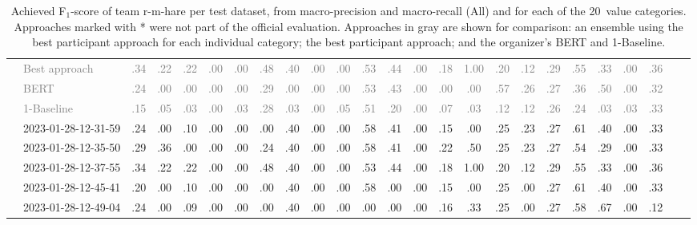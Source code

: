 \begin{table*}
\begin{tabular}{@{}ll@{\hspace{10pt}}c@{\hspace{5pt}}cccccccccccccccccccccc@{}}
& \textcolor{gray}{Best approach} & \textcolor{gray}{.34} & \textcolor{gray}{.22} & \textcolor{gray}{.22} & \textcolor{gray}{.00} & \textcolor{gray}{.00} & \textcolor{gray}{.48} & \textcolor{gray}{.40} & \textcolor{gray}{.00} & \textcolor{gray}{.00} & \textcolor{gray}{.53} & \textcolor{gray}{.44} & \textcolor{gray}{.00} & \textcolor{gray}{.18} & \textcolor{gray}{1.00} & \textcolor{gray}{.20} & \textcolor{gray}{.12} & \textcolor{gray}{.29} & \textcolor{gray}{.55} & \textcolor{gray}{.33} & \textcolor{gray}{.00} & \textcolor{gray}{.36} \\
& \textcolor{gray}{BERT} & \textcolor{gray}{.24} & \textcolor{gray}{.00} & \textcolor{gray}{.00} & \textcolor{gray}{.00} & \textcolor{gray}{.00} & \textcolor{gray}{.29} & \textcolor{gray}{.00} & \textcolor{gray}{.00} & \textcolor{gray}{.00} & \textcolor{gray}{.53} & \textcolor{gray}{.43} & \textcolor{gray}{.00} & \textcolor{gray}{.00} & \textcolor{gray}{.00} & \textcolor{gray}{.57} & \textcolor{gray}{.26} & \textcolor{gray}{.27} & \textcolor{gray}{.36} & \textcolor{gray}{.50} & \textcolor{gray}{.00} & \textcolor{gray}{.32} \\
& \textcolor{gray}{1-Baseline} & \textcolor{gray}{.15} & \textcolor{gray}{.05} & \textcolor{gray}{.03} & \textcolor{gray}{.00} & \textcolor{gray}{.03} & \textcolor{gray}{.28} & \textcolor{gray}{.03} & \textcolor{gray}{.00} & \textcolor{gray}{.05} & \textcolor{gray}{.51} & \textcolor{gray}{.20} & \textcolor{gray}{.00} & \textcolor{gray}{.07} & \textcolor{gray}{.03} & \textcolor{gray}{.12} & \textcolor{gray}{.12} & \textcolor{gray}{.26} & \textcolor{gray}{.24} & \textcolor{gray}{.03} & \textcolor{gray}{.03} & \textcolor{gray}{.33} \\
& 2023-01-28-12-31-59 & .24 & .00 & .10 & .00 & .00 & .00 & .40 & .00 & .00 & .58 & .41 & .00 & .15 & .00 & .25 & .23 & .27 & .61 & .40 & .00 & .33 \\
& 2023-01-28-12-35-50 & .29 & .36 & .00 & .00 & .00 & .24 & .40 & .00 & .00 & .58 & .41 & .00 & .22 & .50 & .25 & .23 & .27 & .54 & .29 & .00 & .33 \\
& 2023-01-28-12-37-55 & .34 & .22 & .22 & .00 & .00 & .48 & .40 & .00 & .00 & .53 & .44 & .00 & .18 & 1.00 & .20 & .12 & .29 & .55 & .33 & .00 & .36 \\
& 2023-01-28-12-45-41 & .20 & .00 & .10 & .00 & .00 & .00 & .40 & .00 & .00 & .58 & .00 & .00 & .15 & .00 & .25 & .00 & .27 & .61 & .40 & .00 & .33 \\
& 2023-01-28-12-49-04 & .24 & .00 & .09 & .00 & .00 & .00 & .40 & .00 & .00 & .00 & .00 & .00 & .16 & .33 & .25 & .00 & .27 & .58 & .67 & .00 & .12 \\
\bottomrule
\end{tabular}
\caption{Achieved F$_1$-score of team r-m-hare per test dataset, from macro-precision and macro-recall (All) and for each of the 20~value categories. Approaches marked with * were not part of the official evaluation. Approaches in gray are shown for comparison: an ensemble using the best participant approach for each individual category; the best participant approach; and the organizer's BERT and 1-Baseline.}
\label{table-results}
\end{table*}
